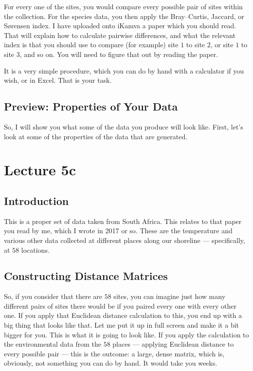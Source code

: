 \documentclass[
  10pt,
]{book}
\begin{document}
For every one of the sites, you would compare every possible pair of
sites within the collection. For the species data, you then apply the
Bray--Curtis, Jaccard, or Sørensen index. I have uploaded onto iKamva a
paper which you should read. That will explain how to calculate pairwise
differences, and what the relevant index is that you should use to
compare (for example) site \(1\) to site \(2\), or site \(1\) to site
\(3\), and so on. You will need to figure that out by reading the paper.

It is a very simple procedure, which you can do by hand with a
calculator if you wish, or in Excel. That is your task.

\section{Preview: Properties of Your
Data}\label{preview-properties-of-your-data}

So, I will show you what some of the data you produce will look like.
First, let's look at some of the properties of the data that are
generated.

\chapter*{Lecture 5c}\label{lecture-5c}

\section{Introduction}\label{introduction-1}

This is a proper set of data taken from South Africa. This relates to
that paper you read by me, which I wrote in 2017 or so. These are the
temperature and various other data collected at different places along
our shoreline --- specifically, at \(58\) locations.

\section{Constructing Distance
Matrices}\label{constructing-distance-matrices}

So, if you consider that there are \(58\) sites, you can imagine just
how many different pairs of sites there would be if you paired every one
with every other one. If you apply that Euclidean distance calculation
to this, you end up with a big thing that looks like that. Let me put it
up in full screen and make it a bit bigger for you. This is what it is
going to look like. If you apply the calculation to the environmental
data from the \(58\) places --- applying Euclidean distance to every
possible pair --- this is the outcome: a large, dense matrix, which is,
obviously, not something you can do by hand. It would take you weeks.
\end{document}
